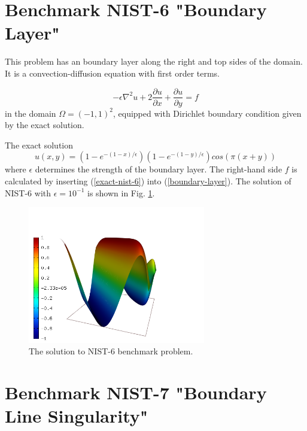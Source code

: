\documentclass[12pt]{elsarticle}
\begin{document}
\section{Benchmark NIST-6 "Boundary Layer"}
\label{sec:bench-6}

This problem has an boundary layer along the right and top sides of the domain.
It is a convection-diffusion equation with first order terms.

\begin{equation} \label{boundary-layer}
-\epsilon \nabla^{2} u + 2\frac{\partial u}{\partial x} + \frac{\partial u}{\partial y}= f
\end{equation}
in the domain $\Omega = (-1, 1)^2$, equipped with Dirichlet boundary condition
given by the exact solution.

The exact solution
\begin{equation}\label{exact-nist-6}
u(x,y) = (1 - e^{-(1 - x) / \epsilon})(1 - e^{-(1 - y) / \epsilon})cos(\pi (x + y))
\end{equation}
where $\epsilon$ determines the strength of the boundary layer.
The right-hand side $f$ is calculated by inserting (\ref{exact-nist-6}) into (\ref{boundary-layer}).
The solution of NIST-6 with $\epsilon = 10^{-1}$ is shown in Fig. \ref{fig:sln-nist06}.

\begin{figure}[!ht]
\centering
\includegraphics[height=6cm]{nist/nist-6/solution.png}
\caption{The solution to NIST-6 benchmark problem.}
\label{fig:sln-nist06}
\end{figure}

\section{Benchmark NIST-7 "Boundary Line Singularity"}
\label{sec:bench-7}
\end{document}
